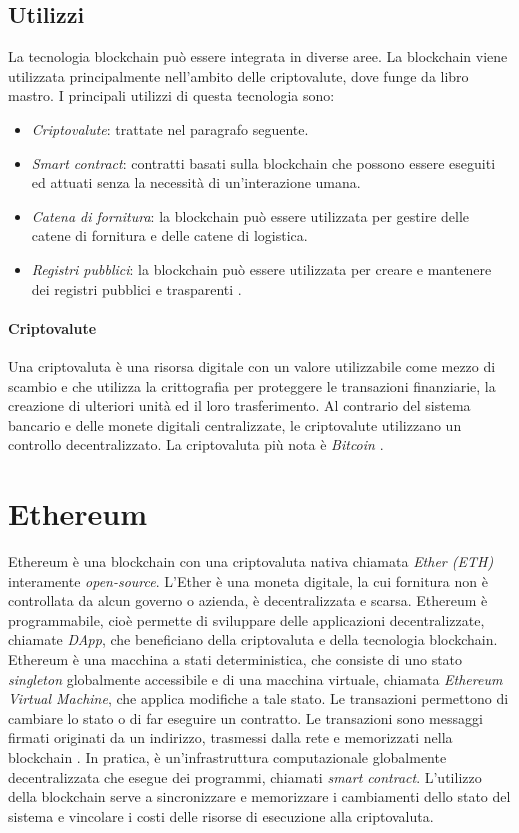 \subsection{Utilizzi}
\label{utilizzi}
La tecnologia blockchain può essere integrata in diverse aree. La blockchain viene utilizzata principalmente nell'ambito delle criptovalute, dove funge da libro mastro.
I principali utilizzi di questa tecnologia sono:
\begin{itemize}
    \item \emph{Criptovalute}: trattate nel paragrafo seguente.
    \item \emph{Smart contract}: contratti basati sulla blockchain che possono essere eseguiti ed attuati senza la necessità di un'interazione umana.
    \item \emph{Catena di fornitura}: la blockchain può essere utilizzata per gestire delle catene di fornitura e delle catene di logistica.
    \item \emph{Registri pubblici}: la blockchain può essere utilizzata per creare e mantenere dei registri pubblici e trasparenti \cite{blockchain}.
\end{itemize}

\paragraph{Criptovalute}
\label{criptovalute}
Una criptovaluta è una risorsa digitale con un valore utilizzabile come mezzo di scambio e che utilizza la crittografia per proteggere le transazioni finanziarie, la creazione di ulteriori unità ed il loro trasferimento. Al contrario del sistema bancario e delle monete digitali centralizzate, le criptovalute utilizzano un controllo decentralizzato. La criptovaluta più nota è \emph{Bitcoin} \cite{criptovaluta}.

\section{Ethereum}
\label{ethereum}
Ethereum è una blockchain con una criptovaluta nativa chiamata \emph{Ether (ETH)} interamente \emph{open-source}. L'Ether è una moneta digitale, la cui fornitura non è controllata da alcun governo o azienda, è decentralizzata e scarsa. Ethereum è programmabile, cioè permette di sviluppare delle applicazioni decentralizzate, chiamate \emph{DApp}, che beneficiano della criptovaluta e della tecnologia blockchain. Ethereum è una macchina a stati deterministica, che consiste di uno stato \emph{singleton} globalmente accessibile e di una macchina virtuale, chiamata \emph{Ethereum Virtual Machine}, che applica modifiche a tale stato. Le transazioni permettono di cambiare lo stato o di far eseguire un contratto. Le transazioni sono messaggi firmati originati da un indirizzo, trasmessi dalla rete e memorizzati nella blockchain \cite{ethereumbook}. In pratica, è un'infrastruttura computazionale globalmente decentralizzata che esegue dei programmi, chiamati \emph{smart contract}. L'utilizzo della blockchain serve a sincronizzare e memorizzare i cambiamenti dello stato del sistema e vincolare i costi delle risorse di esecuzione alla criptovaluta.

